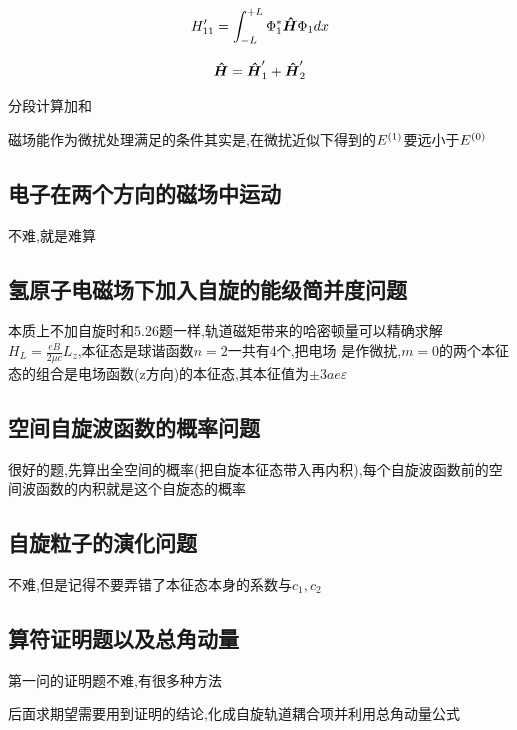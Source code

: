 \documentclass{article}
\begin{document}
            $$
            H'_{11} = \int_{-L}^{+L} \Phi_{1}^{*} \vu*{H} \Phi_{1} dx 
            $$

            $$ \vu*{H} = \vu*{H}'_{1} + \vu*{H}'_{2} $$

            分段计算加和

            磁场能作为微扰处理满足的条件其实是,在微扰近似下得到的$E_{}^{(1)}$要远小于$E_{}^{(0)}$

        \subsection{电子在两个方向的磁场中运动}
            不难,就是难算

        \subsection{氢原子电磁场下加入自旋的能级简并度问题}
            本质上不加自旋时和5.26题一样,轨道磁矩带来的哈密顿量可以精确求解$H_{L} = \frac{eB}{2\mu c} L_{z}$,本征态是球谐函数$n=2$一共有4个,把电场
            是作微扰,$m=0$的两个本征态的组合是电场函数(z方向)的本征态,其本征值为$\pm 3 a e \varepsilon$

        \subsection{空间自旋波函数的概率问题}
            很好的题,先算出全空间的概率(把自旋本征态带入再内积),每个自旋波函数前的空间波函数的内积就是这个自旋态的概率

        \subsection{自旋粒子的演化问题}
            不难,但是记得不要弄错了本征态本身的系数与$c_{1},c_{2}$

        \subsection{算符证明题以及总角动量}
            第一问的证明题不难,有很多种方法

            后面求期望需要用到证明的结论,化成自旋轨道耦合项并利用总角动量公式
            
\end{document}
